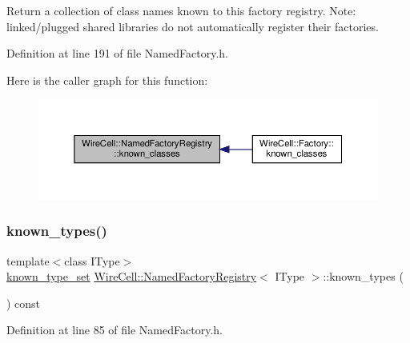 Return a collection of class names known to this factory registry. Note\+: linked/plugged shared libraries do not automatically register their factories. 

Definition at line 191 of file Named\+Factory.\+h.

Here is the caller graph for this function\+:
\nopagebreak
\begin{figure}[H]
\begin{center}
\leavevmode
\includegraphics[width=350pt]{class_wire_cell_1_1_named_factory_registry_ab463521dc3c31192252a4ba154c1d967_icgraph}
\end{center}
\end{figure}
\mbox{\label{class_wire_cell_1_1_named_factory_registry_ab48a0b93547621847770a26929691424}} 
\subsubsection{\texorpdfstring{known\+\_\+types()}{known\_types()}}
{\footnotesize\ttfamily template$<$class I\+Type$>$ \\
\hyperlink{class_wire_cell_1_1_named_factory_registry_a166047268e8cb29c0ea05ae35a80db0c}{known\+\_\+type\+\_\+set} \hyperlink{class_wire_cell_1_1_named_factory_registry}{Wire\+Cell\+::\+Named\+Factory\+Registry}$<$ I\+Type $>$\+::known\+\_\+types (\begin{DoxyParamCaption}{ }\end{DoxyParamCaption}) const\hspace{0.3cm}{\ttfamily [inline]}}



Definition at line 85 of file Named\+Factory.\+h.


